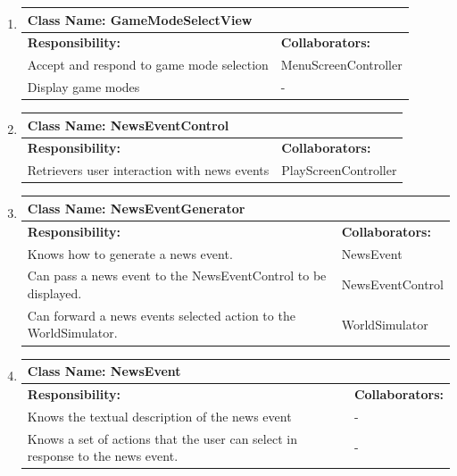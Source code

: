\documentclass[]{article}
\begin{document}
\begin{enumerate}[1.]
\begin{tabular}{|p{10cm}|p{4cm}|}
	    \hline
	  \end{tabular}

	\item
	\begin{tabular}{|p{10cm}|p{4cm}|}
	    \hline
	     \multicolumn{2}{|l|}{\textbf{Class Name:  GameModeSelectView}} \\
	    \hline
	    \textbf{Responsibility:} & \textbf{Collaborators:} \\
	    \hline
	    Accept and respond to game mode selection & MenuScreenController \\
	Display game modes & - \\

	    \hline
	  \end{tabular}

	\item
	\begin{tabular}{|p{10cm}|p{4cm}|}
	    \hline
	     \multicolumn{2}{|l|}{\textbf{Class Name:  NewsEventControl}} \\
	    \hline
	    \textbf{Responsibility:} & \textbf{Collaborators:} \\
	    \hline
	    Retrievers user interaction with news events & PlayScreenController \\

	    \hline
	  \end{tabular}

	\item
	\begin{tabular}{|p{10cm}|p{4cm}|}
	    \hline
	     \multicolumn{2}{|l|}{\textbf{Class Name:  NewsEventGenerator}} \\
	    \hline
	    \textbf{Responsibility:} & \textbf{Collaborators:} \\
	    \hline
	    Knows how to generate a news event. & NewsEvent \\
	Can pass a news event to the NewsEventControl to be displayed. & NewsEventControl \\
	Can forward a news events selected action to the WorldSimulator. & WorldSimulator \\

	    \hline
	  \end{tabular}

	\item
	\begin{tabular}{|p{10cm}|p{4cm}|}
	    \hline
	     \multicolumn{2}{|l|}{\textbf{Class Name:  NewsEvent}} \\
	    \hline
	    \textbf{Responsibility:} & \textbf{Collaborators:} \\
	    \hline
	    Knows the textual description of the news event & - \\
	Knows a set of actions that the user can select in response to the news event. & - \\


\end{tabular}
\end{enumerate}
\end{document}
